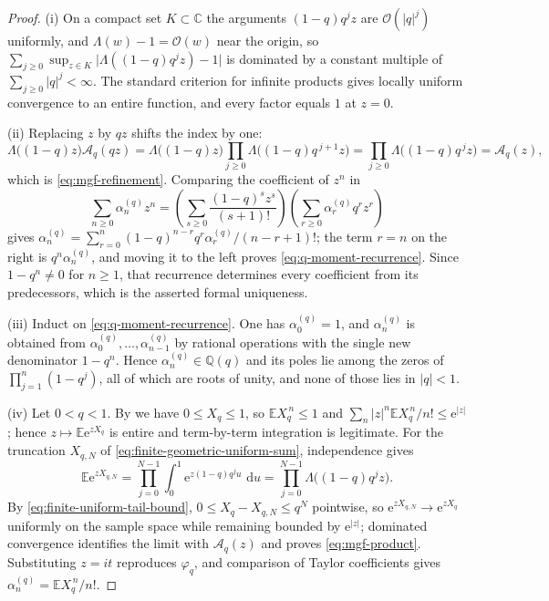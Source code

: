 \documentclass[11pt,oneside,openany]{book}
\theoremstyle{definition}
\theoremstyle{remark}
\newcommand{\C}{\mathbb C}
\newcommand{\Q}{\mathbb Q}
\newcommand{\OO}{\mathcal O}
\newcommand{\e}{\mathrm e}
\newcommand{\dd}{\,\mathrm d}
\newcommand{\abs}[1]{\lvert #1\rvert}
\begin{document}
\begin{proof}
(i)  On a compact set $K\subset\C$ the arguments $(1-q)q^jz$ are $\OO(\abs q^j)$ uniformly,
and $\Lambda(w)-1=\OO(w)$ near the origin, so
$\sum_{j\ge0}\sup_{z\in K}\abs{\Lambda((1-q)q^jz)-1}$ is dominated by a constant multiple of
$\sum_{j\ge0}\abs q^j<\infty$.  The standard criterion for infinite products gives locally
uniform convergence to an entire function, and every factor equals $1$ at $z=0$.

(ii)  Replacing $z$ by $qz$ shifts the index by one:
\[
 \Lambda\bigl((1-q)z\bigr)\mathcal A_q(qz)
 =\Lambda\bigl((1-q)z\bigr)\prod_{j\ge0}\Lambda\bigl((1-q)q^{\,j+1}z\bigr)
 =\prod_{j\ge0}\Lambda\bigl((1-q)q^{\,j}z\bigr)
 =\mathcal A_q(z),
\]
which is \eqref{eq:mgf-refinement}.  Comparing the coefficient of $z^n$ in
\[
 \sum_{n\ge0}\alpha^{(q)}_nz^n
 =\left(\sum_{s\ge0}\frac{(1-q)^sz^s}{(s+1)!}\right)
  \left(\sum_{r\ge0}\alpha^{(q)}_rq^rz^r\right)
\]
gives $\alpha^{(q)}_n=\sum_{r=0}^{n}(1-q)^{n-r}q^r\alpha^{(q)}_r/(n-r+1)!$; the term $r=n$ on
the right is $q^n\alpha^{(q)}_n$, and moving it to the left proves
\eqref{eq:q-moment-recurrence}.  Since $1-q^n\ne0$ for $n\ge1$, that recurrence determines
every coefficient from its predecessors, which is the asserted formal uniqueness.

(iii)  Induct on \eqref{eq:q-moment-recurrence}.  One has $\alpha^{(q)}_0=1$, and
$\alpha^{(q)}_n$ is obtained from $\alpha^{(q)}_0,\ldots,\alpha^{(q)}_{n-1}$ by rational
operations with the single new denominator $1-q^n$.  Hence $\alpha^{(q)}_n\in\Q(q)$ and its
poles lie among the zeros of $\prod_{j=1}^{n}(1-q^j)$, all of which are roots of unity, and
none of those lies in $\abs q<1$.

(iv)  Let $0<q<1$.  By  we have $0\le X_q\le1$, so
$\mathbb EX_q^{\,n}\le1$ and $\sum_n\abs z^n\mathbb EX_q^{\,n}/n!\le\e^{\abs z}$; hence
$z\mapsto\mathbb E\e^{zX_q}$ is entire and term-by-term integration is legitimate.  For the
truncation $X_{q,N}$ of \eqref{eq:finite-geometric-uniform-sum}, independence gives
\[
 \mathbb E\e^{zX_{q,N}}
 =\prod_{j=0}^{N-1}\int_0^1\e^{z(1-q)q^ju}\,\dd u
 =\prod_{j=0}^{N-1}\Lambda\bigl((1-q)q^jz\bigr).
\]
By \eqref{eq:finite-uniform-tail-bound}, $0\le X_q-X_{q,N}\le q^N$ pointwise, so
$\e^{zX_{q,N}}\to\e^{zX_q}$ uniformly on the sample space while remaining bounded by
$\e^{\abs z}$; dominated convergence identifies the limit with $\mathcal A_q(z)$ and proves
\eqref{eq:mgf-product}.  Substituting $z=it$ reproduces $\varphi_q$, and comparison of Taylor
coefficients gives $\alpha^{(q)}_n=\mathbb EX_q^{\,n}/n!$.
\end{proof}
\end{document}
